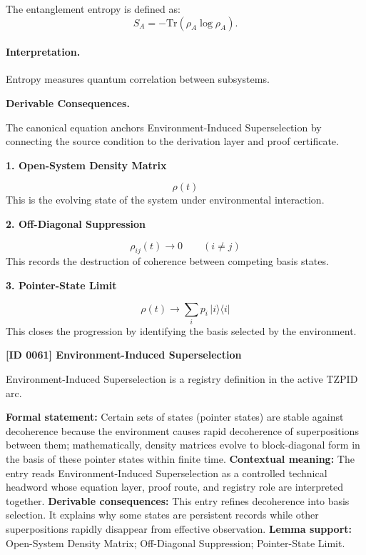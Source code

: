 The entanglement entropy is defined as:
\begin{equation}
S_A = -\mathrm{Tr}(\rho_A \log \rho_A).
\end{equation}

\paragraph{Interpretation.}
Entropy measures quantum correlation between subsystems.

\par\vspace{0.35em}
\noindent\textbf{Derivable Consequences.}\quad
\begingroup
\footnotesize
\raggedright
The canonical equation anchors Environment-Induced Superselection by connecting the source condition to the derivation layer and proof certificate.
\par\endgroup

\noindent\textbf{1. Open-System Density Matrix}\par
\[
\rho(t)
\]
\noindent This is the evolving state of the system under environmental interaction.\par
\noindent\textbf{2. Off-Diagonal Suppression}\par
\[
\rho_{ij}(t) \to 0
\qquad (i \neq j)
\]
\noindent This records the destruction of coherence between competing basis states.\par
\noindent\textbf{3. Pointer-State Limit}\par
\[
\rho(t) \to \sum_{i} p_{i}\,\lvert i\rangle\langle i\rvert
\]
\noindent This closes the progression by identifying the basis selected by the environment.\par

\clearpage
\noindent\textbf{[ID 0061] Environment-Induced Superselection}\par
\vspace{0.35em}
\begingroup\small
{}
Environment-Induced Superselection is a registry definition in the active TZPID arc.

\begingroup\footnotesize\setlength{\emergencystretch}{3em}\sloppy
\textbf{Formal statement:} Certain sets of states (pointer states) are stable against decoherence because the environment causes rapid decoherence of superpositions between them; mathematically, density matrices evolve to block-diagonal form in the basis of these pointer states within finite time. \textbf{Contextual meaning:} The entry reads Environment-Induced Superselection as a controlled technical headword whose equation layer, proof route, and registry role are interpreted together. \textbf{Derivable consequences:} This entry refines decoherence into basis selection. It explains why some states are persistent records while other superpositions rapidly disappear from effective observation. \textbf{Lemma support:} Open-System Density Matrix; Off-Diagonal Suppression; Pointer-State Limit.\par
\endgroup


